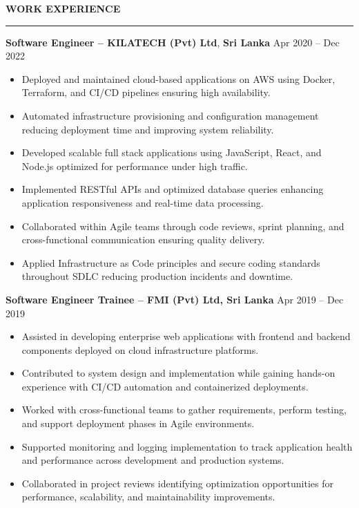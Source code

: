 \documentclass[10pt,letterpaper]{article}
\begin{document}
\vspace{8pt}

\textbf{WORK EXPERIENCE}\\[-8pt]
\noindent\rule{\textwidth}{1pt}

\vspace{-2pt}

\textbf{Software Engineer -- KILATECH (Pvt) Ltd}, \textbf{Sri Lanka} \hfill Apr 2020 -- Dec 2022

\vspace{-1pt}

\begin{itemize}
\item Deployed and maintained cloud-based applications on AWS using Docker, Terraform, and CI/CD pipelines ensuring high availability.
\item Automated infrastructure provisioning and configuration management reducing deployment time and improving system reliability.
\item Developed scalable full stack applications using JavaScript, React, and Node.js optimized for performance under high traffic.
\item Implemented RESTful APIs and optimized database queries enhancing application responsiveness and real-time data processing.
\item Collaborated within Agile teams through code reviews, sprint planning, and cross-functional communication ensuring quality delivery.
\item Applied Infrastructure as Code principles and secure coding standards throughout SDLC reducing production incidents and downtime.
\end{itemize}

\textbf{Software Engineer Trainee -- FMI (Pvt) Ltd, Sri Lanka} \hfill Apr 2019 -- Dec 2019

\vspace{-1pt}

\begin{itemize}
\item Assisted in developing enterprise web applications with frontend and backend components deployed on cloud infrastructure platforms.
\item Contributed to system design and implementation while gaining hands-on experience with CI/CD automation and containerized deployments.
\item Worked with cross-functional teams to gather requirements, perform testing, and support deployment phases in Agile environments.
\item Supported monitoring and logging implementation to track application health and performance across development and production systems.
\item Collaborated in project reviews identifying optimization opportunities for performance, scalability, and maintainability improvements.
\end{itemize}
\end{document}
